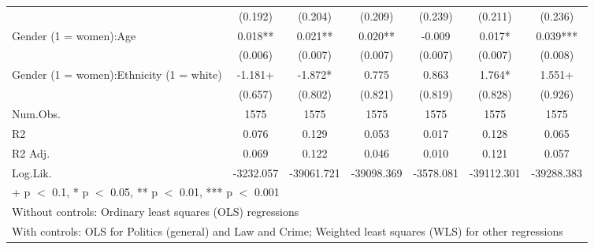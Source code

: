 \documentclass[
  letterpaper,
  DIV=11,
  numbers=noendperiod]{scrreprt}
\begin{document}
\begin{table}
\begin{tabular}[t]{lcccccc}
\hspace{1em} & (0.192) & (0.204) & (0.209) & (0.239) & (0.211) & (0.236)\\
\hspace{1em}Gender (1 = women):Age & 0.018** & 0.021** & 0.020** & -0.009 & 0.017* & 0.039***\\
\hspace{1em} & (0.006) & (0.007) & (0.007) & (0.007) & (0.007) & (0.008)\\
\hspace{1em}Gender (1 = women):Ethnicity (1 = white) & -1.181+ & -1.872* & 0.775 & 0.863 & 1.764* & 1.551+\\
\hspace{1em} & (0.657) & (0.802) & (0.821) & (0.819) & (0.828) & (0.926)\\
\hspace{1em}Num.Obs. & 1575 & 1575 & 1575 & 1575 & 1575 & 1575\\
\hspace{1em}R2 & 0.076 & 0.129 & 0.053 & 0.017 & 0.128 & 0.065\\
\hspace{1em}R2 Adj. & 0.069 & 0.122 & 0.046 & 0.010 & 0.121 & 0.057\\
\hspace{1em}Log.Lik. & -3232.057 & -39061.721 & -39098.369 & -3578.081 & -39112.301 & -39288.383\\
\bottomrule
\multicolumn{7}{l}{\rule{0pt}{1em}+ p $<$ 0.1, * p $<$ 0.05, ** p $<$ 0.01, *** p $<$ 0.001}\\
\multicolumn{7}{l}{\rule{0pt}{1em}Without controls: Ordinary least squares (OLS) regressions}\\
\multicolumn{7}{l}{\rule{0pt}{1em}With controls: OLS for Politics (general) and Law and Crime; Weighted least squares (WLS) for other regressions}\\
\end{tabular}
\end{table}
\end{document}
